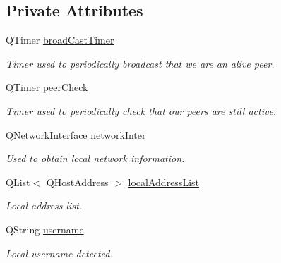 \subsection*{\-Private \-Attributes}
\begin{DoxyCompactItemize}
\item 
\-Q\-Timer \hyperlink{class_network_discover_a82d0981a5c6c1acecd85a0e210b631f2}{broad\-Cast\-Timer}
\begin{DoxyCompactList}\small\item\em \-Timer used to periodically broadcast that we are an alive peer. \end{DoxyCompactList}\item 
\-Q\-Timer \hyperlink{class_network_discover_ad23e0a7d95e0fed29acae8f193dfcfc3}{peer\-Check}
\begin{DoxyCompactList}\small\item\em \-Timer used to periodically check that our peers are still active. \end{DoxyCompactList}\item 
\-Q\-Network\-Interface \hyperlink{class_network_discover_a67c037cca501b587cc8c24ab5d971553}{network\-Inter}
\begin{DoxyCompactList}\small\item\em \-Used to obtain local network information. \end{DoxyCompactList}\item 
\-Q\-List$<$ \-Q\-Host\-Address $>$ \hyperlink{class_network_discover_a9db1fe648d568707cfcda8f00d2b5f5a}{local\-Address\-List}
\begin{DoxyCompactList}\small\item\em \-Local address list. \end{DoxyCompactList}\item 
\-Q\-String \hyperlink{class_network_discover_ad9dcef0352b63920211c0b442741bebb}{username}
\begin{DoxyCompactList}\small\item\em \-Local username detected. \end{DoxyCompactList}\end{DoxyCompactItemize}
